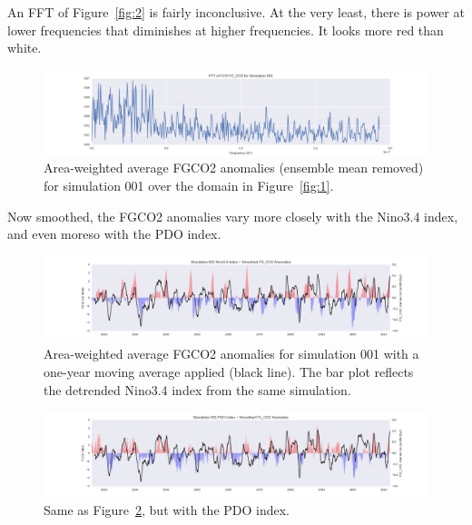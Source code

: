 \documentclass[12pt]{article}
\begin{document}
An FFT of Figure~\ref{fig:2} is fairly inconclusive. At the very least, there is power at lower frequencies that diminishes at higher frequencies. It looks more red than white.
\newpage
\begin{figure}[!h]
	\centering
	\includegraphics[width=\linewidth]{../../figs/calcs/fft/fft-CCS-001-frequencyHz.png}
	\caption{Area-weighted average FGCO2 anomalies (ensemble mean removed) for simulation 001 over the domain in Figure~\ref{fig:1}.}
	\label{fig:4}
\end{figure}

Now smoothed, the FGCO2 anomalies vary more closely with the Nino3.4 index, and even moreso with the PDO index.
\begin{figure}[!h]
	\centering
	\includegraphics[width=\linewidth]{../../figs/calcs/timeseries/ccs-smoothed-fgco2-and-nino34-plot.png}
	\caption{Area-weighted average FGCO2 anomalies for simulation 001 with a one-year moving average applied (black line). The bar plot reflects the detrended Nino3.4 index from the same simulation.}
	\label{fig:5}
\end{figure}
\begin{figure}[!h]
	\centering
	\includegraphics[width=\linewidth]{../../figs/calcs/timeseries/ccs-smoothed-fgco2-and-pdo-plot.png}
	\caption{Same as Figure~\ref{fig:5}, but with the PDO index.}
	\label{fig:6}
\end{figure}
\end{document}

